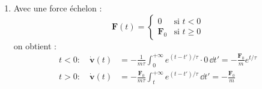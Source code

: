 \documentclass[a4paper,10pt]{report}
\begin{document}
\begin{enumerate}
			\item Avec une force échelon :
			\[
			\textbf{{F}}(t) = 
			\begin{cases}
				0 & \text{si } t < 0 \\
				\textbf{{F}}_0 & \text{si } t \geq 0
			\end{cases}
			\]
			on obtient :
			\begin{align*}
				t < 0: \quad \dot{\textbf{v}}(t) &= -\frac{1}{m\tau} \int_0^{+\infty} e^{(t - t')/\tau} \cdot 0 \, \dd t' = -\frac{\textbf{{F}}_0}{m} e^{t/\tau} \\
				t > 0: \quad \dot{\textbf{v}}(t) &= -\frac{\textbf{F}_0}{m\tau} \int_t^{+\infty} e^{(t - t')/\tau} \, \dd t' = -\frac{\textbf{{F}}_0}{m}
			\end{align*}
			
		\end{enumerate}
\end{document}
